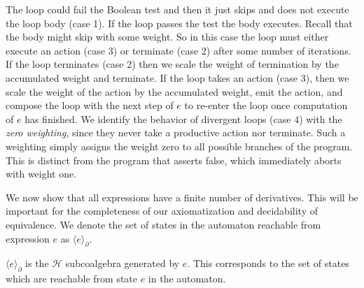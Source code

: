 \documentclass[a4paper,UKenglish,cleveref, autoref, thm-restate]{lipics-v2021}
\theoremstyle{plain}\newtheoremrep{thm}{Theorem}[section]
\begin{document}
	
	The loop could fail the Boolean test and then it just skips and does not execute the loop body (case 1). If the loop passes the test the body executes. Recall that the body might skip with some weight. So in this case the loop must either execute an action (case 3) or terminate (case 2) after some number of iterations. If the loop terminates (case 2) then we scale the weight of termination by the accumulated weight and terminate. If the loop takes an action (case 3), then we scale the weight of the action by the accumulated weight, emit the action, and compose the loop with the next step of $e$ to re-enter the loop once computation of $e$ has finished. We identify the behavior of divergent loops (case 4) with the \emph{zero weighting}, since they never take a productive action nor terminate. Such a weighting simply assigns the weight zero to all possible branches of the program. This is distinct from the program that asserts false, which immediately aborts with weight one.
	
	We now show that all expressions have a finite number of derivatives. This will be important for the completeness of our axiomatization and decidability of equivalence. We denote the set of states in the automaton reachable from expression $e$ as $\langle e\rangle_\partial$. 
	
	\begin{toappendix}
		$\langle e\rangle_\partial$ is the $\mathcal{H}$ subcoalgebra generated by $e$. This corresponds to the set of states which are reachable from state $e$ in the automaton.
	\end{toappendix}
	
\end{document}
